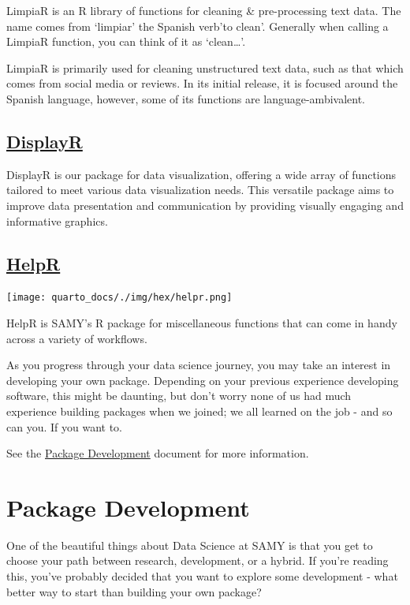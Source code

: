 \documentclass[
  letterpaper,
  DIV=11,
  numbers=noendperiod]{scrreprt}
\begin{document}
LimpiaR is an R library of functions for cleaning \& pre-processing text
data. The name comes from `limpiar' the Spanish verb'to clean'.
Generally when calling a LimpiaR function, you can think of it as
`clean\ldots{}'.

LimpiaR is primarily used for cleaning unstructured text data, such as
that which comes from social media or reviews. In its initial release,
it is focused around the Spanish language, however, some of its
functions are language-ambivalent.

\section{\texorpdfstring{\href{https://jpcompartir.github.io/DisplayR/}{DisplayR}}{DisplayR}}\label{displayr}

DisplayR is our package for data visualization, offering a wide array of
functions tailored to meet various data visualization needs. This
versatile package aims to improve data presentation and communication by
providing visually engaging and informative graphics.

\section{\texorpdfstring{\href{https://avery-island.github.io/HelpR/index.html}{HelpR}}{HelpR}}\label{helpr}

\texttt{[image: quarto\_docs/./img/hex/helpr.png]}

HelpR is SAMY's R package for miscellaneous functions that can come in
handy across a variety of workflows.

As you progress through your data science journey, you may take an
interest in developing your own package. Depending on your previous
experience developing software, this might be daunting, but don't worry
none of us had much experience building packages when we joined; we all
learned on the job - and so can you. If you want to.

See the \href{package_development.qmd}{Package Development} document for
more information.

\chapter{Package Development}\label{package-development}

One of the beautiful things about Data Science at SAMY is that you get
to choose your path between research, development, or a hybrid. If
you're reading this, you've probably decided that you want to explore
some development - what better way to start than building your own
package?
\end{document}
